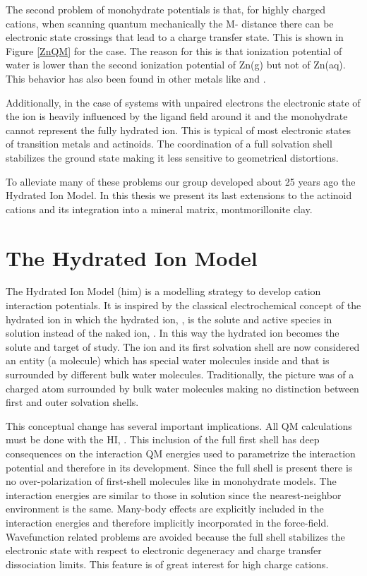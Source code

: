 The second problem of monohydrate potentials is that, for highly charged cations, when scanning 
quantum mechanically the 
M- distance there can be electronic state crossings that lead to a charge transfer 
state. This is
shown in Figure \ref{ZnQM} for the \ce{[Zn*(H2O)]^{2+}]} case. The reason for this is that 
ionization potential of water is lower than the second ionization potential of 
Zn(g) but not of Zn(aq).\cite{floris1995free,JPhysChem_ESM_1992} This behavior has also been found 
in other 
metals like  and 
.\cite{JPhysChemA_ESM_2000,Elrod1994,curtiss1987nonadditivity}

Additionally, in the case of systems with unpaired electrons the electronic 
state of the ion is heavily influenced by the ligand field around it and the monohydrate cannot 
represent the fully hydrated ion. This is typical of most electronic states of transition 
metals and actinoids. The  coordination of a full solvation shell stabilizes the ground state 
making it less sensitive to 
geometrical distortions.

To alleviate many of these problems our group developed about 25 years ago the Hydrated Ion Model. 
In this thesis we present its last extensions to the actinoid cations and its integration into a 
mineral matrix, montmorillonite clay. 

\section{The Hydrated Ion Model}\label{sec:HIM}
The Hydrated Ion Model (\gls{him}) is a modelling strategy to develop cation interaction potentials. 
It is 
inspired by the classical electrochemical concept of the hydrated ion in which the hydrated ion, 
, is the solute and active species in solution instead of the 
naked ion, . In this 
way the hydrated ion becomes the solute and target of study. The ion and its first solvation shell 
are now considered an entity (a molecule) which has special water molecules inside and that is 
surrounded by 
different bulk water molecules. Traditionally, the picture was of a charged atom surrounded by bulk 
water molecules making no distinction between first and outer solvation shells. 

This conceptual change has several important implications. All 
QM calculations must be done with the HI, . This inclusion of 
the full first shell has deep consequences on the interaction QM energies used to parametrize the 
interaction potential and therefore in its development. Since the full shell is present there is no 
over-polarization of  first-shell molecules like in monohydrate models. The interaction energies 
are similar to those in solution since the nearest-neighbor environment is the same. Many-body 
effects are explicitly included in the interaction energies and therefore implicitly incorporated 
in the force-field. Wavefunction related problems are 
avoided because the full shell stabilizes the electronic state with respect to electronic degeneracy 
and charge transfer dissociation limits. This feature is of great interest for high charge cations. 

